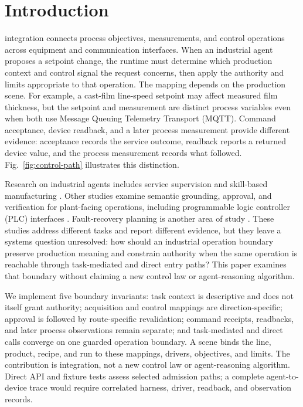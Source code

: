 \section{Introduction}
 integration connects process objectives, measurements, and control operations across equipment and communication interfaces. When an industrial agent proposes a setpoint change, the runtime must determine which production context and control signal the request concerns, then apply the authority and limits appropriate to that operation. The mapping depends on the production scene. For example, a cast-film line-speed setpoint may affect measured film thickness, but the setpoint and measurement are distinct process variables even when both use Message Queuing Telemetry Transport (MQTT). Command acceptance, device readback, and a later process measurement provide different evidence: acceptance records the service outcome, readback reports a returned device value, and the process measurement records what followed. Fig.~\ref{fig:control-path} illustrates this distinction.



Research on industrial agents includes service supervision and skill-based manufacturing \cite{biskupovic2025supervision,koehle2026llmdriven}. Other studies examine semantic grounding, approval, and verification for plant-facing operations, including programmable logic controller (PLC) interfaces \cite{graul2026aas,schall2026safe}. Fault-recovery planning is another area of study \cite{vyas2026detection}. These studies address different tasks and report different evidence, but they leave a systems question unresolved: how should an industrial operation boundary preserve production meaning and constrain authority when the same operation is reachable through task-mediated and direct entry paths? This paper examines that boundary without claiming a new control law or agent-reasoning algorithm.

We implement five boundary invariants: task context is descriptive and does not itself grant authority; acquisition and control mappings are direction-specific; approval is followed by route-specific revalidation; command receipts, readbacks, and later process observations remain separate; and task-mediated and direct calls converge on one guarded operation boundary. A scene binds the line, product, recipe, and run to these mappings, drivers, objectives, and limits. The contribution is integration, not a new control law or agent-reasoning algorithm. Direct API and fixture tests assess selected admission paths; a complete agent-to-device trace would require correlated harness, driver, readback, and observation records.

